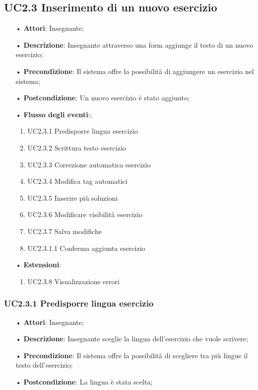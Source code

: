 


\subsection{UC2.3 Inserimento di un nuovo esercizio}
\begin{itemize}
	\item[•] \textbf{Attori}: Insegnante;
	\item[•] \textbf{Descrizione}: Insegnante attraverso una form aggiunge il testo di un nuovo esercizio;
	\item[•] \textbf{Precondizione}: Il sistema offre la possibilità di aggiungere un esercizio nel sistema;
	\item[•] \textbf{Postcondizione}: Un nuovo esercizio è stato aggiunto;
	\item[•] \textbf{Flusso degli eventi}:;
	\begin{enumerate}
		\item UC2.3.1 Predisporre lingua esercizio
		\item UC2.3.2 Scrittura testo esercizio
		\item UC2.3.3 Correzione automatica esercizio
		\item UC2.3.4 Modifica tag automatici
		\item UC2.3.5 Inserire più soluzioni
		\item UC2.3.6 Modificare visibilità esercizio
		\item UC2.3.7 Salva modifiche
		\item UC2.3.1.1	Conferma aggiunta esercizio
	\end{enumerate}
	\item[•] \textbf{Estensioni}:	
	\begin{enumerate}
		\item UC2.3.8 Visualizzazione errori
	\end{enumerate}
\end{itemize}

\subsubsection{UC2.3.1 Predisporre lingua esercizio}
\begin{itemize}
	\item[•] \textbf{Attori}: Insegnante;
	\item[•] \textbf{Descrizione}: Insegnante sceglie la lingua dell’esercizio che vuole scrivere;
	\item[•] \textbf{Precondizione}: Il sistema offre la possibilità di scegliere tra più lingue il testo 
			dell’esercizio;
	\item[•] \textbf{Postcondizione}: La lingua è stata scelta;
\end{itemize}

